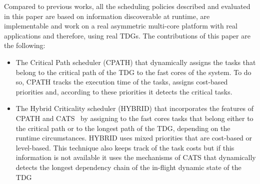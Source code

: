 Compared to previous works, all the scheduling policies described and evaluated in this paper are based on information discoverable at runtime, are implementable and work on a real asymmetric multi-core platform with real applications and therefore, using real TDGs.
The contributions of this paper are the following: 
\begin{itemize}
 \item{The Critical Path scheduler (CPATH) that dynamically assigns the tasks that belong to the critical path of the TDG to the fast cores of the system. To do so, CPATH tracks the execution time of the tasks, assigns cost-based priorities and, according to these priorities it detects the critical tasks.}
 \item{The Hybrid Criticality scheduler (HYBRID) that incorporates the features of CPATH and CATS~\cite{Chronaki:ICS2015} by assigning to the fast cores tasks that belong either to the critical path or to the longest path of the TDG, depending on the runtime circumstances. HYBRID uses mixed priorities that are cost-based or level-based. This technique also keeps track of the task costs but if this information is not available it uses the mechanisms of CATS that dynamically detects the longest dependency chain of the in-flight dynamic state of the TDG}
 

\end{itemize}

